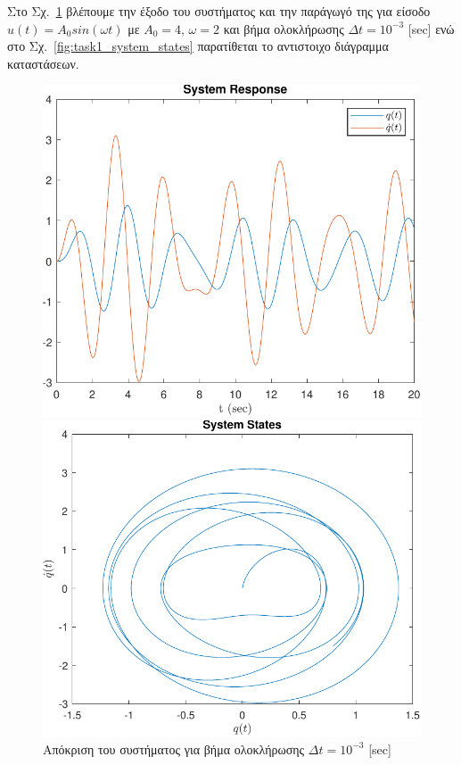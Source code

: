 \documentclass[a4paper,12pt]{article}
\begin{document}
Στο Σχ.~\ref{fig:task1_system_response} βλέπουμε την έξοδο του συστήματος και την παράγωγό της για είσοδο 
$u(t) = A_0 sin(\omega t)$ με $A_0 = 4, \, \omega = 2$ και βήμα ολοκλήρωσης $\Delta t = 10^{-3}$
[sec] ενώ στο Σχ.~\ref{fig:task1_system_states} παρατίθεται το 
αντιστοιχο διάγραμμα καταστάσεων.

\begin{figure}[!h]
    \centering
    \begin{minipage}{0.45\textwidth}
        \centering
        \includegraphics[width=\linewidth]{plot/task1_system_response.pdf}
        \caption{Απόκριση του συστήματος για βήμα ολοκλήρωσης $\Delta t = 10^{-3}$ 
        [sec]}
        \label{fig:task1_system_response}
    \end{minipage}
    \hfill
    \begin{minipage}{0.45\textwidth}
        \centering
        \includegraphics[width=\linewidth]{plot/task1_system_states.pdf}

\end{minipage}
\end{figure}
\end{document}
